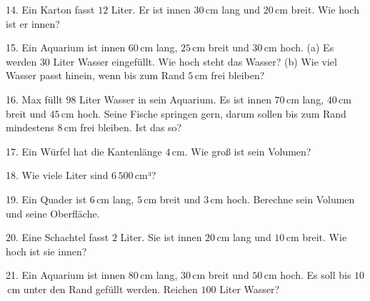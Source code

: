 \documentclass[11pt]{article}
\begin{document}
\begin{pfaufg}{}{14.}{}
Ein Karton fasst $12$ Liter. Er ist innen $30$\,cm lang und $20$\,cm breit. Wie hoch ist er innen?
\end{pfaufg}

\begin{pfaufg}{}{15.}{}
Ein Aquarium ist innen $60$\,cm lang, $25$\,cm breit und $30$\,cm hoch. (a) Es werden $30$ Liter Wasser eingefüllt. Wie hoch steht das Wasser? (b) Wie viel Wasser passt hinein, wenn bis zum Rand $5$\,cm frei bleiben?
\end{pfaufg}

\begin{pfaufg}{}{16.}{}
Max füllt $98$ Liter Wasser in sein Aquarium. Es ist innen $70$\,cm lang, $40$\,cm breit und $45$\,cm hoch. Seine Fische springen gern, darum sollen bis zum Rand mindestens $8$\,cm frei bleiben. Ist das so?
\end{pfaufg}

\begin{pfaufg}{}{17.}{}
Ein Würfel hat die Kantenlänge $4$\,cm. Wie groß ist sein Volumen?\par\smallskip {}\par {}
\end{pfaufg}

\begin{pfaufg}{}{18.}{}
Wie viele Liter sind $6\,500$\,cm³?
\end{pfaufg}

\begin{pfaufg}{}{19.}{}
Ein Quader ist $6$\,cm lang, $5$\,cm breit und $3$\,cm hoch. Berechne sein Volumen und seine Oberfläche.
\end{pfaufg}

\begin{pfaufg}{}{20.}{}
Eine Schachtel fasst $2$ Liter. Sie ist innen $20$\,cm lang und $10$\,cm breit. Wie hoch ist sie innen?
\end{pfaufg}

\begin{pfaufg}{}{21.}{}
Ein Aquarium ist innen $80$\,cm lang, $30$\,cm breit und $50$\,cm hoch. Es soll bis $10$\,cm unter den Rand gefüllt werden. Reichen $100$ Liter Wasser?
\end{pfaufg}

\par\vfill{}
\end{document}

